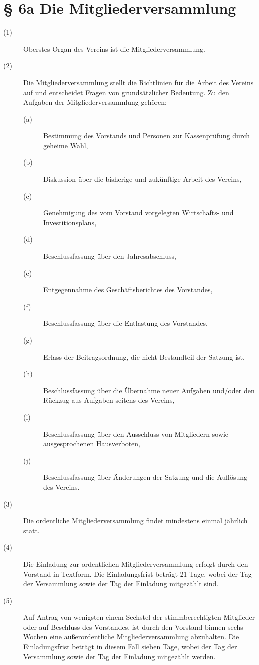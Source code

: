 \documentclass[a4paper,12pt]{scrartcl}
\begin{document}
\section*{\S{} 6a Die Mitgliederversammlung}
\begin{description} 

\item[(1)] Oberstes Organ des Vereins ist die Mitgliederversammlung.
\item[(2)] Die Mitgliederversammlung stellt die Richtlinien für die Arbeit des Vereins auf und entscheidet Fragen von grundsätzlicher Bedeutung. Zu den Aufgaben der Mitgliederversammlung gehören:
\begin{description} 
\item[(a)] Bestimmung des Vorstands und Personen zur Kassenprüfung durch geheime Wahl,
\item[(b)] Diskussion über die bisherige und zukünftige Arbeit des Vereins,
\item[(c)] Genehmigung des vom Vorstand vorgelegten Wirtschafts- und Investitionsplans,
\item[(d)] Beschlussfassung über den Jahresabschluss,
\item[(e)] Entgegennahme des Geschäftsberichtes des Vorstandes,
\item[(f)] Beschlussfassung über die Entlastung des Vorstandes,
\item[(g)] Erlass der Beitragsordnung, die nicht Bestandteil der Satzung ist,
\item[(h)] Beschlussfassung über die Übernahme neuer Aufgaben und/oder den Rückzug aus Aufgaben seitens des Vereins,
\item[(i)] Beschlussfassung über den Ausschluss von Mitgliedern sowie ausgesprochenen Hausverboten,
\item[(j)] Beschlussfassung über Änderungen der Satzung und die Auflösung des Vereins.
\end{description}
\item[(3)] Die ordentliche Mitgliederversammlung findet mindestens einmal jährlich statt.
\item[(4)] Die Einladung zur ordentlichen Mitgliederversammlung erfolgt durch den Vorstand in Textform. Die Einladungsfrist beträgt 21 Tage, wobei der Tag der Versammlung sowie der Tag der Einladung mitgezählt sind.
\item[(5)] Auf Antrag von wenigsten einem Sechstel der stimmberechtigten Mitglieder oder auf Beschluss des Vorstandes, ist durch den Vorstand binnen sechs Wochen eine außerordentliche Mitgliederversammlung abzuhalten. Die Einladungsfrist beträgt in diesem Fall sieben Tage, wobei der Tag der Versammlung sowie der Tag der Einladung mitgezählt werden.

\end{description}
\end{document}
